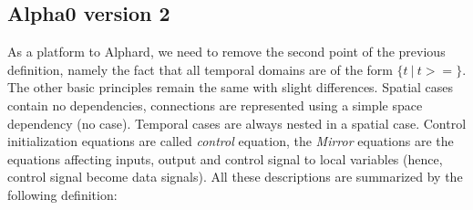 \documentclass[a4paper,11pt]{article}
\newcommand{\Alpha}{{{Alpha}}}
\newcommand{\AlphaZ}{{{\Alpha}0}}
\newcommand{\Alphard}{{Alphard}}
\begin{document}
\subsection{{\AlphaZ} version 2}
As a platform to {\Alphard}, we need to remove the second point of
the previous definition, namely the fact that all temporal domains are
of the form $\{t~|~ t>=\}$. The other basic principles remain the same
with slight differences. Spatial cases contain no dependencies,
connections are represented using a simple space dependency (no
case). Temporal cases are always nested in a spatial case.
Control initialization equations are called {\em control} equation,
the {\em Mirror} equations are the equations affecting inputs, output 
and control signal to local variables (hence, control signal 
become data signals). All these descriptions are summarized by the following 
definition:
\end{document}

